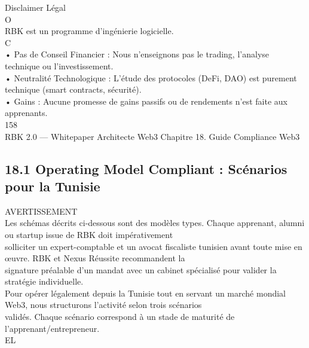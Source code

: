 \documentclass[12pt,landscape,a4paper]{article}
\begin{document}
Disclaimer Légal\\
O\\
\vspace{0.5em}
RBK est un programme d’ingénierie logicielle.\\
C\\
\vspace{0.5em}
\vspace{0.5em}
• Pas de Conseil Financier : Nous n’enseignons pas le trading, l’analyse technique ou l’investissement.\\
\vspace{0.5em}
• Neutralité Technologique : L’étude des protocoles (DeFi, DAO) est purement technique (smart contracts, sécurité).\\
\vspace{0.5em}
• Gains : Aucune promesse de gains passifs ou de rendements n’est faite aux apprenants.\\
\vspace{0.5em}
\vspace{0.5em}
\vspace{0.5em}
\vspace{0.5em}
158\\
RBK 2.0 — Whitepaper Architecte Web3                                                                 Chapitre 18. Guide Compliance Web3\\
\vspace{0.5em}
\vspace{0.5em}
\vspace{0.5em}
\subsection{18.1 Operating Model Compliant : Scénarios pour la Tunisie}
AVERTISSEMENT\\
Les schémas décrits ci-dessous sont des modèles types. Chaque apprenant, alumni ou startup issue de RBK doit impérativement\\
solliciter un expert-comptable et un avocat fiscaliste tunisien avant toute mise en œuvre. RBK et Nexus Réussite recommandent la\\
signature préalable d’un mandat avec un cabinet spécialisé pour valider la stratégie individuelle.\\
\vspace{0.5em}
Pour opérer légalement depuis la Tunisie tout en servant un marché mondial Web3, nous structurons l’activité selon trois scénarios\\
validés. Chaque scénario correspond à un stade de maturité de l’apprenant/entrepreneur.\\
\vspace{0.5em}
\vspace{0.5em}
\vspace{0.5em}
\vspace{0.5em}
EL\\
\end{document}
